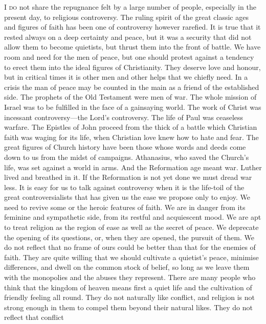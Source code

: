 \documentclass[12pt,a5paper,oneside]{book}
\begin{document}
\textsc{I do} not share the repugnance felt by a large 
number of people, especially in the present day, to 
religious controversy. The ruling spirit of the great 
classic ages and figures of faith has been one of controversy 
however rarefied. It is true that it rested 
always on a deep certainty and peace, but it was a security 
that did not allow them to become quietists, but 
thrust them into the front of battle. We have room 
and need for the men of peace, but one should protest 
against a tendency to erect them into the ideal figures 
of Christianity. They deserve love and honour, but in 
critical times it is other men and other helps that we 
chiefly need. In a crisis the man of peace may be 
counted in the main as a friend of the established side. 
The prophets of the Old Testament were men of war. 
The whole mission of Israel was to be fulfilled in the 
face of a gainsaying world. The work of Christ 
was incessant controversy---the Lord's controversy. 
The life of Paul was ceaseless warfare. The Epistles 
of John proceed from the thick of a battle which 
Christian faith was waging for its life, when 
Christian love knew how to hate and fear. The 
great figures of Church history have been those 
whose words and deeds come down to us from the 
midst of campaigns. Athanasius, who saved the 
Church's life, was set against a world in arms. And 
the Reformation age meant war. Luther lived and 
breathed in it. If the Reformation is not yet done 
we must dread war less. It is easy for us to talk 
against controversy when it is the life-toil of the 
great controversialists that has given us the ease we 
propose only to enjoy. We need to revive some or 
the heroic features of faith. We are in danger from 
its feminine and sympathetic side, from its restful and 
acquiescent mood. We are apt to treat religion as 
the region of ease as well as the secret of peace. We 
deprecate the opening of its questions, or, when they 
are opened, the pursuit of them. We do not reflect 
that no frame of ours could be better than that for the 
enemies of faith. They are quite willing that we 
should cultivate a quietist's peace, minimise differences, 
and dwell on the common stock of belief, so long as 
we leave them with the monopolies and the abuses 
they represent. There are many people who think 
that the kingdom of heaven means first a quiet life 
and the cultivation of friendly feeling all round. 
They do not naturally like conflict, and religion is 
not strong enough in them to compel them beyond 
their natural likes. They do not reflect that conflict 
\end{document}

